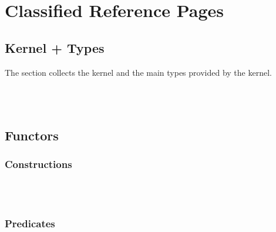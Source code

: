 \section{Classified Reference Pages}

\subsection{Kernel + Types}

The section collects the kernel and the main types provided by the
kernel.



\\
\\


\subsection{Functors}

\subsubsection{Constructions}



\\
\\

\subsubsection{Predicates}

